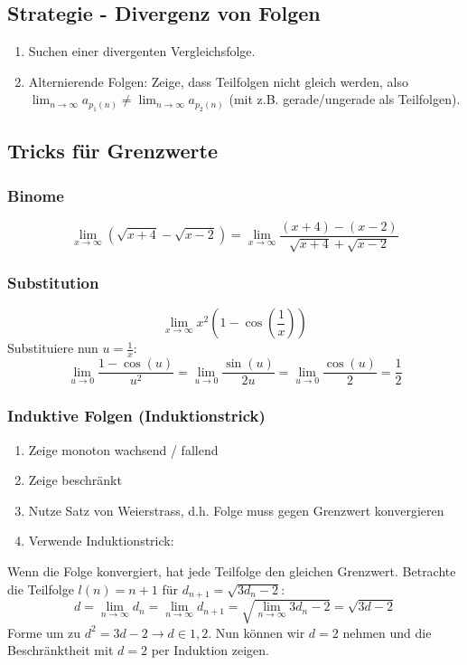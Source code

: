 \documentclass[a4paper,10pt]{article}
\def\limn{\lim_{n\to \infty}}
\begin{document}
\subsection{Strategie - Divergenz von Folgen}
\begin{enumerate}
 \item Suchen einer divergenten Vergleichsfolge.
 \item Alternierende Folgen: Zeige, dass Teilfolgen nicht gleich werden, also $\limn a_{p_1(n)} \ne \limn a_{p_2(n)}$ (mit z.B. gerade/ungerade als Teilfolgen).
\end{enumerate}

\subsection{Tricks für Grenzwerte}
\subsubsection{Binome}
$$\lim_{x\to\infty} (\sqrt{x + 4} - \sqrt{x - 2}) = \lim_{x\to\infty} \frac{(x+4)-(x-2)}{\sqrt{x+4}+\sqrt{x-2}}$$

\subsubsection{Substitution}
$$\lim_{x\to\infty} x^2 (1-\cos(\frac{1}{x}))$$
Substituiere nun $u = \frac{1}{x}$:
$$\lim_{u \to 0} \frac{1 - \cos(u)}{u^2} = \lim_{u \to 0} \frac{\sin(u)}{2u} = \lim_{u\to 0} \frac{\cos(u)}{2} = \frac{1}{2}$$

\subsubsection{Induktive Folgen (Induktionstrick)}
\begin{enumerate}
  \item Zeige monoton wachsend / fallend
  \item Zeige beschränkt
  \item Nutze Satz von Weierstrass, d.h. Folge muss gegen Grenzwert konvergieren
  \item Verwende Induktionstrick:
\end{enumerate}
Wenn die Folge konvergiert, hat jede Teilfolge den gleichen Grenzwert. Betrachte die Teilfolge $l(n) = n + 1$ für $d_{n+1} = \sqrt{3d_n - 2}$:
$$d = \lim_{n\to\infty} d_n = \lim_{n\to\infty} d_{n+1} = \sqrt{\lim_{n \to \infty} 3d_n -2} = \sqrt{3d -2}$$
Forme um zu $ d^2 = 3d -2 \to d \in {1,2}$. Nun können wir $d = 2$ nehmen und die Beschränktheit mit $d=2$ per Induktion zeigen.
\end{document}
